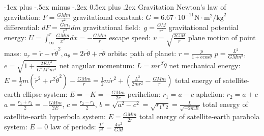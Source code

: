 \documentclass[10pt,landscape]{article}
\makeatletter
\renewcommand{\subsection}{\@startsection{subsection}{2}{0mm}%
                                {-1ex plus -.5ex minus -.2ex}%
                                {0.5ex plus .2ex}%
                                {\normalfont\normalsize\bfseries}}
\newcommand{\spc}{\hspace*{1em}}
\makeatother
\begin{document}
\begin{multicols*}{3}
\subsection{Gravitation}
Newton's law of gravitation: $F=\frac{GMm}{r^2}$
\newline
gravitational constant: $G=6.67\cdot 10^{-11}\textrm{N}\cdot \textrm{m}^2/\textrm{kg}^2$
\newline
\spc differential: $dF=\frac{Gm_1}{r^2}dm$
\newline
gravitational field: $g=\frac{GM}{r^2}$
\newline
gravitational potential energy: $U=\int_{\infty }^{r}\frac{GMm}{x^2}dx=-\frac{GMm}{r}$
\newline
\spc escape speed: $v=\sqrt{\frac{2GM}{r}}$
\newline
\newline
plane motion of point mass:
\newline
\spc $a_r=\ddot{r}-r\dot{\theta}^2,a_\theta=2\dot{r}\dot{\theta}+r\ddot{\theta}$
\newline \newline
orbits:
\newline
\spc path of planet: $r=\frac{p}{1+e\mathrm{cos}\theta }$
\newline
\spc \spc $p=\frac{L^2}{GMm^2}$, $e=\sqrt{1+\frac{2EL^2}{G^2M^2m^3}}$
\newline
\spc net angular momentum: $L=mr^2\dot{\theta }$
\newline
\spc net mechanical energy: $E=\frac{1}{2}m(\dot{r}^2+r^2\dot{\theta} ^2)-\frac{GMm}{r}=\frac{1}{2}m\dot{r}^2+(\frac{L^2}{2mr^2}-\frac{GMm}{r})$
\newline
total energy of satellite-earth ellipse system:
$E=-K=-\frac{GMm}{2r}$
\newline
\spc perihelion: $r_1=a-c$
\newline
\spc aphelion: $r_2=a+c$
\newline
\spc\spc $a=\frac{r_1+r_2}{2}=-\frac{GMm}{2E}$, $c=\frac{r_2-r_1}{2}$, \spc\spc $b=\sqrt{a^2-c^2}=\sqrt{r_1r_2}=\frac{L}{\sqrt{-2mE}}$
\newline
total energy of satellite-earth hyperbola system: $E=\frac{GMm}{2r}$
\newline
total energy of satellite-earth parabola system: $E=0$
\newline
law of periods: $\frac{T^2}{r^3}=\frac{4 \pi ^2}{GM}$


\end{multicols*}
\end{document}
